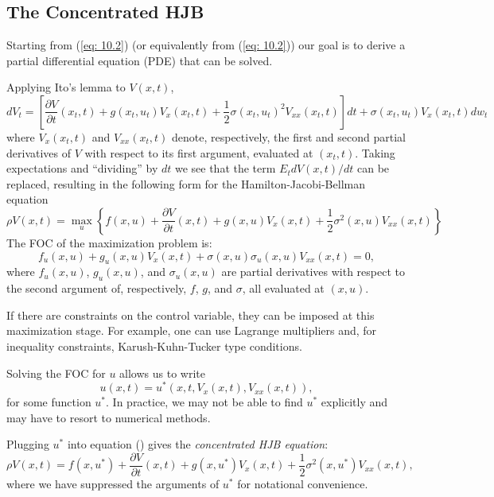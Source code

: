 \documentclass[\topdir/lecture\_notes.tex]{subfiles}
\begin{document}
\subsection{The Concentrated HJB}
Starting from (\ref{eq: 10.2}) (or equivalently from (\ref{eq: 10.2})) our goal is to derive a partial differential equation (PDE) that can be solved.

Applying Ito's lemma to $V(x,t)$,
\begin{equation*}
dV_t = \left[\frac{\partial V}{\partial t}(x_t,t)+ g(x_t, u_t) V_{x}(x_t,t)+\frac{1}{2} \sigma(x_t,u_t)^{2} V_{xx}(x_t,t)\right] dt+\sigma(x_t,u_t) V_{x}(x_t,t) dw_t
\end{equation*}
where $V_x(x_t,t)$ and $V_{xx}(x_t,t)$ denote, respectively, the first and second partial derivatives of $V$ with respect to its first argument, evaluated at $(x_t,t)$. Taking expectations and ``dividing'' by $dt$ we see that the term $E_{t} dV(x, t) / dt$ can be replaced, resulting in the following form for the Hamilton-Jacobi-Bellman equation
\begin{equation*}
\rho V(x,t) = \max_{u} \left\{ f(x, u)+\frac{\partial V}{\partial t}(x,t)+ g(x,u) V_{x}(x,t)+\frac{1}{2} \sigma^{2}(x,u) V_{xx}(x,t) \right\}
\end{equation*}
The FOC of the maximization problem is:
\begin{equation*}
f_{u}(x, u) + g_{u}(x, u) V_{x}(x,t) + \sigma(x,u) \sigma_u(x,u) V_{xx}(x,t)=0, \label{eq: 10.3}
\end{equation*}
where $f_{u}(x, u)$, $g_{u}(x, u)$, and $\sigma_u(x,u)$ are partial derivatives with respect to the second argument of, respectively, $f$, $g$, and $\sigma$, all evaluated at $(x, u)$.

If there are constraints on the control variable, they can be imposed at this maximization stage. For example, one can use Lagrange multipliers and, for inequality constraints, Karush-Kuhn-Tucker type conditions.

Solving the FOC for $u$ allows us to write
\begin{equation*}
u(x,t) = u^*(x, t, V_{x}(x,t), V_{xx}(x,t)), \label{eq: ustar}
\end{equation*}
for some function $u^*$. In practice, we may not be able to find $u^*$ explicitly and may have to resort to numerical methods.

Plugging $u^*$ into equation (\label{eq: 10.3}) gives the \emph{concentrated HJB equation}:
\begin{equation}
\rho V(x,t)=f(x,u^{*})+\frac{\partial V}{\partial t}(x,t)+g(x,u^{*})V_{x}(x,t)+\frac{1}{2}\sigma^{2}(x,u^{*})V_{xx}(x,t),\label{eq: hjb_conc}
\end{equation}
where we have suppressed the arguments of $u^*$ for notational convenience. 
\end{document}
